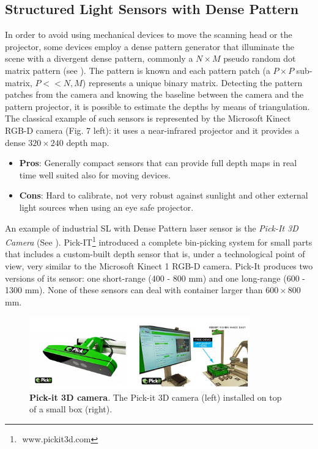 \subsection{Structured Light Sensors with Dense Pattern}\label{subsec:sl_sensors_dp}
In order to avoid using mechanical devices to move the scanning head or the projector, some devices employ a dense pattern generator that illuminate the scene with a divergent dense pattern, commonly a $N \times M$ pseudo random dot matrix pattern (see ). The pattern is known and each pattern patch (a $P \times P$ sub-matrix, $P << N, M$) represents a unique binary matrix. Detecting the pattern patches from the camera and knowing the baseline between the camera and the pattern projector, it is possible to estimate the depths by means of triangulation. The classical example of such sensors is represented by the Microsoft Kinect RGB-D camera (Fig. 7 left): it uses a near-infrared projector and it provides a dense $320 \times 240$ depth map.

\begin{itemize}
	\item \textbf{Pros}: Generally compact sensors that can provide full depth maps in real time well suited also for moving devices.
	\item \textbf{Cons}: Hard to calibrate, not very robust against sunlight and other external light sources when using an eye safe projector.
\end{itemize}

An example of industrial SL with Dense Pattern laser sensor is the \emph{Pick-It 3D Camera} (See ). Pick-IT\footnote{​ www.pickit3d.com} introduced a complete bin-picking system for small parts that includes a custom-built depth sensor  that is, under a technological point of view, very similar to the Microsoft Kinect 1 RGB-D camera. Pick-It produces two versions of its sensor: one short-range (400 - 800 mm) and one long-range (600 - 1300 mm). None of these sensors can deal with container larger than $600 \times 800$ mm.

\begin{figure}
    \centering
    \includegraphics[width=0.85\textwidth]{figures/1_perception_and_sensing_in_robotics/pick_it_3d}
    \caption{\textbf{Pick-it 3D camera}. The Pick-it 3D camera (left) installed on top of a small box (right).} 
    \label{fig:pick_it_3d}
\end{figure}

